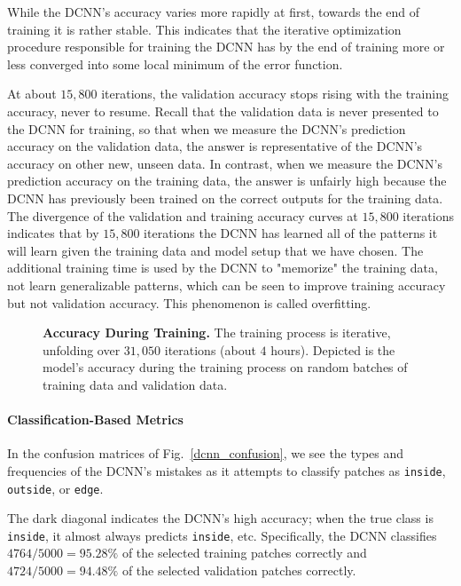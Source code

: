 \documentclass[10pt,letterpaper]{article}
\begin{document}
            While the DCNN's accuracy varies more rapidly at first, towards the end of training it is rather stable. This indicates that the iterative optimization procedure responsible for training the DCNN has by the end of training more or less converged into some local minimum of the error function.
            
            At about $15,800$ iterations, the validation accuracy stops rising with the training accuracy, never to resume. Recall that the validation data is never presented to the DCNN for training, so that when we measure the DCNN's prediction accuracy on the validation data, the answer is representative of the DCNN's accuracy on other new, unseen data. In contrast, when we measure the DCNN's prediction accuracy on the training data, the answer is unfairly high because the DCNN has previously been trained on the correct outputs for the training data. The divergence of the validation and training accuracy curves at $15,800$ iterations indicates that by $15,800$ iterations the DCNN has learned all of the patterns it will learn given the training data and model setup that we have chosen. The additional training time is used by the DCNN to "memorize" the training data, not learn generalizable patterns, which can be seen to improve training accuracy but not validation accuracy. This phenomenon is called overfitting.
            
            \begin{figure}[h]
                
                \caption{{\bf Accuracy During Training.} The training process is iterative, unfolding over $31,050$ iterations (about $4$ hours). Depicted is the model's accuracy during the training process on random batches of training data and validation data.}
                \label{dcnn_convergence}
            \end{figure}
        
        \paragraph*{Classification-Based Metrics}
            In the confusion matrices of Fig.~\ref{dcnn_confusion}, we see the types and frequencies of the DCNN's mistakes as it attempts to classify patches as \texttt{inside}, \texttt{outside}, or \texttt{edge}.
            
            The dark diagonal indicates the DCNN's high accuracy; when the true class is \texttt{inside}, it almost always predicts \texttt{inside}, etc. Specifically, the DCNN classifies $4764 / 5000 = 95.28\%$ of the selected training patches correctly and $4724 / 5000 = 94.48\%$ of the selected validation patches correctly.
            
\end{document}
